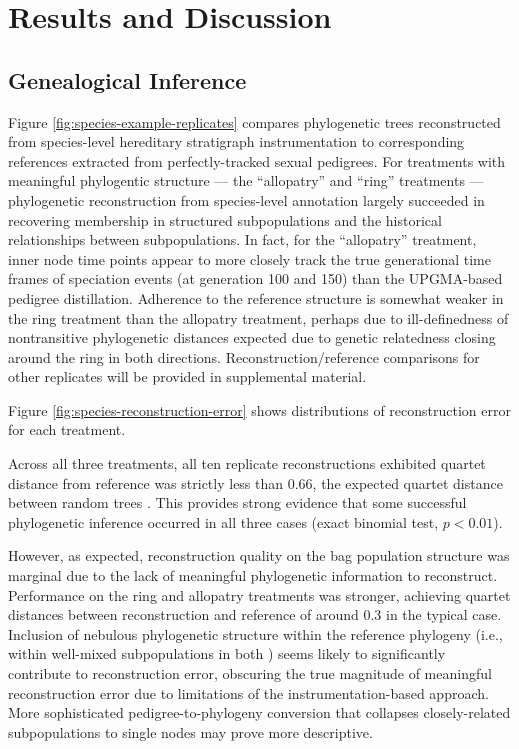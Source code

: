 \section{Results and Discussion} \label{sec:results}

\subsection{Genealogical Inference}



Figure \ref{fig:species-example-replicates} compares phylogenetic trees reconstructed from species-level hereditary stratigraph instrumentation to corresponding references extracted from perfectly-tracked sexual pedigrees.
For treatments with meaningful phylogentic structure --- the ``allopatry'' and ``ring'' treatments --- phylogenetic reconstruction from species-level annotation largely succeeded in recovering membership in structured subpopulations and the historical relationships between subpopulations.
In fact, for the ``allopatry'' treatment, inner node time points appear to more closely track the true generational time frames of speciation events (at generation 100 and 150) than the UPGMA-based pedigree distillation.
Adherence to the reference structure is somewhat weaker in the ring treatment than the allopatry treatment, perhaps due to ill-definedness of nontransitive phylogenetic distances expected due to genetic relatedness closing around the ring in both directions.
Reconstruction/reference comparisons for other replicates will be provided in supplemental material.



Figure \ref{fig:species-reconstruction-error} shows distributions of reconstruction error for each treatment.

Across all three treatments, all ten replicate reconstructions exhibited quartet distance from reference was strictly less than 0.66, the expected quartet distance between random trees \citep{smith2020information}.
This provides strong evidence that some successful phylogenetic inference occurred in all three cases (exact binomial test, $p < 0.01$).

However, as expected, reconstruction quality on the bag population structure was marginal due to the lack of meaningful phylogenetic information to reconstruct.
Performance on the ring and allopatry treatments was stronger, achieving quartet distances between reconstruction and reference of around 0.3 in the typical case.
Inclusion of nebulous phylogenetic structure within the reference phylogeny (i.e., within well-mixed subpopulations in both ) seems likely to significantly contribute to reconstruction error, obscuring the true magnitude of meaningful reconstruction error due to limitations of the instrumentation-based approach.
More sophisticated pedigree-to-phylogeny conversion that collapses closely-related subpopulations to single nodes may prove more descriptive.

